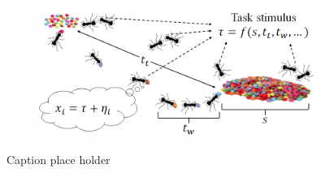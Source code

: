 \documentclass[12pt]{article}
\begin{document}
\begin{figure}[ht!]
\begin{subfigure}[t]{0.5\textwidth}
        \caption{}
    \end{subfigure}
    \begin{subfigure}[t]{1\textwidth}
        \centering
        \includegraphics[width=1\textwidth]{figures/foraging.png}
        \caption{}
    \end{subfigure}    
    \caption{Caption place holder}    
\end{figure}

%
%
\end{document}
